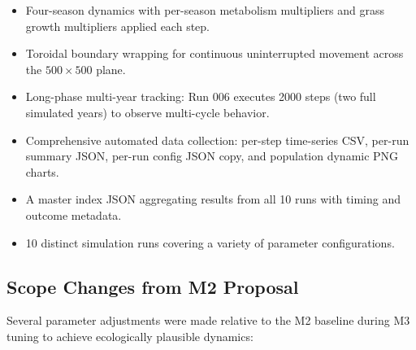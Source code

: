 \documentclass[12pt]{article}
\begin{document}
\begin{itemize}
    \item Four-season dynamics with per-season metabolism multipliers and grass
    growth multipliers applied each step.

    \item Toroidal boundary wrapping for continuous uninterrupted movement
    across the $500 \times 500$ plane.

    \item Long-phase multi-year tracking: Run 006 executes 2000 steps (two
    full simulated years) to observe multi-cycle behavior.

    \item Comprehensive automated data collection: per-step time-series CSV,
    per-run summary JSON, per-run config JSON copy, and population dynamic PNG
    charts.

    \item A master index JSON aggregating results from all 10 runs with timing
    and outcome metadata.

    \item 10 distinct simulation runs covering a variety of parameter
    configurations.
\end{itemize}

\subsection{Scope Changes from M2 Proposal}

Several parameter adjustments were made relative to the M2 baseline during M3
tuning to achieve ecologically plausible dynamics:
\end{document}
